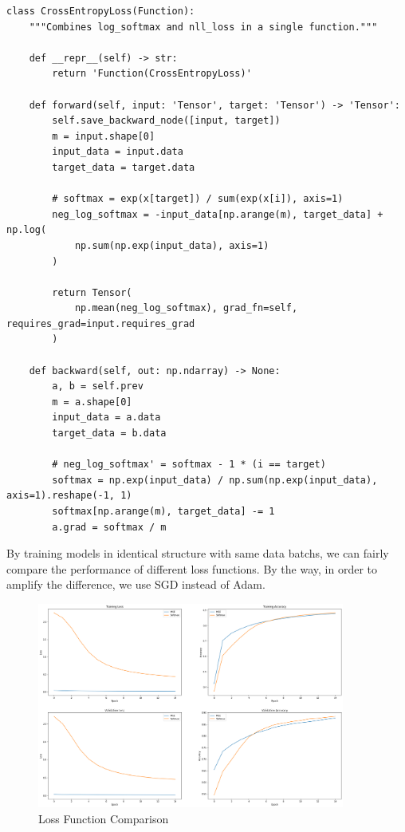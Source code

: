 \documentclass[a4paper, 11pt]{article} %
\begin{document}
\begin{lstlisting}
class CrossEntropyLoss(Function):
    """Combines log_softmax and nll_loss in a single function."""

    def __repr__(self) -> str:
        return 'Function(CrossEntropyLoss)'

    def forward(self, input: 'Tensor', target: 'Tensor') -> 'Tensor':
        self.save_backward_node([input, target])
        m = input.shape[0]
        input_data = input.data
        target_data = target.data

        # softmax = exp(x[target]) / sum(exp(x[i]), axis=1)
        neg_log_softmax = -input_data[np.arange(m), target_data] + np.log(
            np.sum(np.exp(input_data), axis=1)
        )

        return Tensor(
            np.mean(neg_log_softmax), grad_fn=self, requires_grad=input.requires_grad
        )

    def backward(self, out: np.ndarray) -> None:
        a, b = self.prev
        m = a.shape[0]
        input_data = a.data
        target_data = b.data

        # neg_log_softmax' = softmax - 1 * (i == target)
        softmax = np.exp(input_data) / np.sum(np.exp(input_data), axis=1).reshape(-1, 1)
        softmax[np.arange(m), target_data] -= 1
        a.grad = softmax / m
\end{lstlisting}

By training models in identical structure with same data batchs, we can fairly compare the
performance of different loss functions. By the way, in order to amplify the difference,
we use SGD instead of Adam.

\begin{figure}[H]
    \centering
    \includegraphics[width=0.9\textwidth]{./img/loss-function.png}
    \caption{Loss Function Comparison}
\end{figure}
\end{document}
